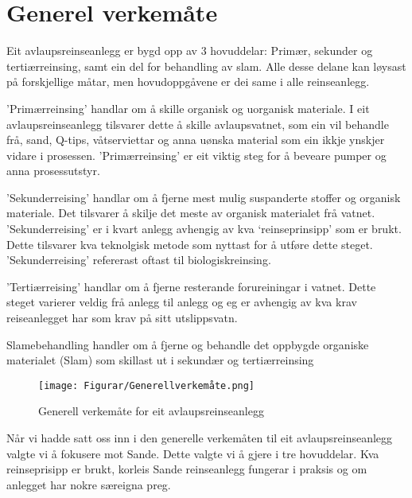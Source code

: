 \section{Generel verkemåte}

Eit avlaupsreinseanlegg er bygd opp av 3 hovuddelar: Primær, sekunder og tertiærreinsing,
samt ein del for behandling av slam.
Alle desse delane kan løysast på forskjellige måtar, men hovudoppgåvene er dei same
i alle reinseanlegg.

'Primærreinsing' handlar om å skille organisk og uorganisk materiale.
I eit avlaupsreinseanlegg tilsvarer dette å skille avlaupsvatnet, 
som ein vil behandle frå, sand, Q-tips, våtserviettar
og anna uønska material som ein ikkje ynskjer vidare i prosessen. \newline
'Primærreinsing' er eit viktig steg for å beveare pumper og anna prosessutstyr.

'Sekunderreising' handlar om å fjerne mest mulig suspanderte stoffer og organisk materiale.
Det tilsvarer å skilje det meste av organisk materialet frå vatnet.
'Sekunderreising' er i kvart anlegg avhengig av kva `reinseprinsipp' som er brukt. Dette tilsvarer
kva teknolgisk metode som nyttast for å utføre dette steget.
'Sekunderreising' refererast oftast til biologiskreinsing.

'Tertiærreising' handlar om å fjerne resterande forureiningar i vatnet.
Dette steget varierer veldig frå anlegg til anlegg og eg er
avhengig av kva krav reiseanlegget har som krav på sitt utslippsvatn.

Slamebehandling handler om å fjerne og behandle det oppbygde organiske materialet (Slam)
som skillast ut i sekundær og tertiærreinsing 

\begin{figure}[htbp]
    \centering
    \texttt{[image: Figurar/Generellverkemåte.png]}
    \caption{Generell verkemåte for eit avlaupsreinseanlegg}\label{fig:HMI}
\end{figure}

Når vi hadde satt oss inn i den generelle verkemåten til eit avlaupsreinseanlegg
valgte vi å fokusere mot Sande.
Dette valgte vi å gjere i tre hovuddelar. Kva reinseprisipp er brukt, korleis Sande reinseanlegg
fungerar i praksis og om anlegget har nokre særeigna preg.
